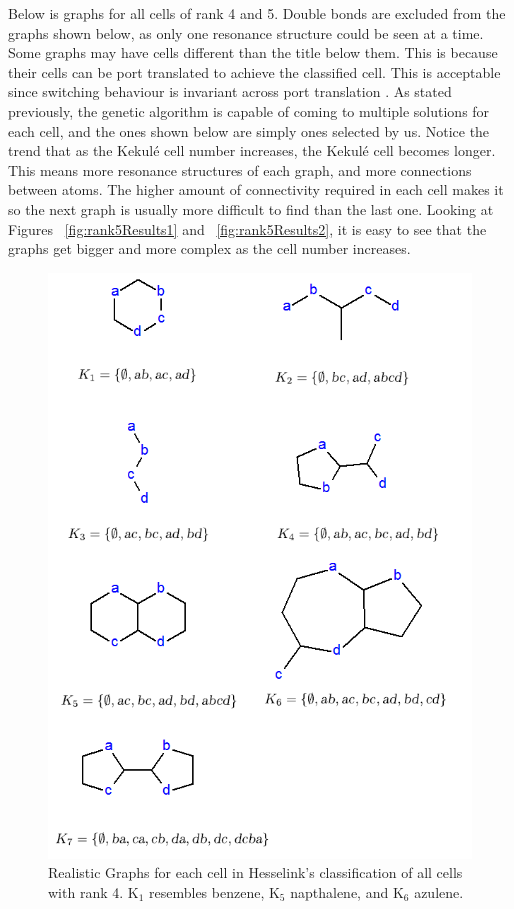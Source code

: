 \documentclass[12pt]{article}
\begin{document}
Below is graphs for all cells of rank 4 and 5. Double bonds are excluded from the graphs shown below, as only one resonance structure could be seen at a time. Some graphs may have cells different than the title below them. This is because their cells can be port translated to achieve the classified cell. This is acceptable since switching behaviour is invariant across port translation \cite{HH13}. As stated previously, the genetic algorithm is capable of coming to multiple solutions for each cell, and the ones shown below are simply ones selected by us. Notice the trend that as the Kekul\'e cell number increases, the Kekul\'e cell becomes longer. This means more resonance structures of each graph, and more connections between atoms. The higher amount of connectivity required in each cell makes it so the next graph is usually more difficult to find than the last one. Looking at Figures ~\ref{fig:rank5Results1} and ~\ref{fig:rank5Results2}, it is easy to see that the graphs get bigger and more complex as the cell number increases. 

\begin{figure}[ht!]
\centering
\includegraphics[width=130mm]{rank4Results.png}
\caption{Realistic Graphs for each cell in Hesselink's classification of all cells with rank 4. K$_1$ resembles benzene, K$_5$ napthalene, and K$_6$ azulene.}
\label{fig:rank4Results}
\end{figure}
\end{document}
